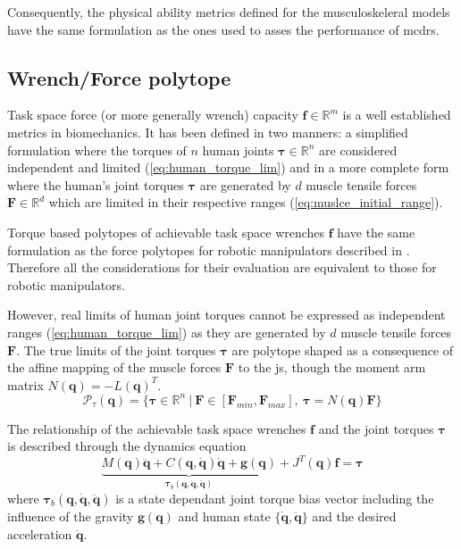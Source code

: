 Consequently, the physical ability metrics defined for the musculoskeleral models have the same formulation as the ones used to asses the performance of \glspl{mcdr}.

\subsection{Wrench/Force polytope}
\label{ch:force_poly_human}
Task space force (or more generally wrench) capacity $\bm{f} \in \mathbb{R}^m$ is a well established metrics in biomechanics. It has been defined in two manners: a simplified formulation where the torques of $n$ human joints $\bm{\tau} \in \mathbb{R}^n$ are considered independent and limited (\ref{eq:human_torque_lim}) and in a more complete form where the human's joint torques $\bm{\tau}$ are generated by $d$ muscle tensile forces $\bm{F} \in \mathbb{R}^d$ which are limited in their respective ranges (\ref{eq:muslce_initial_range}).

Torque based polytopes \cite{rezzoug_application_2012,sasaki2011vertex} of achievable task space wrenches $\bm{f}$ have the same formulation as the force polytopes for robotic manipulators described in . Therefore all the considerations for their evaluation are equivalent to those for robotic manipulators.  

However, real limits of human joint torques cannot be expressed as independent ranges (\ref{eq:human_torque_lim}) as they are generated by $d$ muscle tensile forces $\bm{F}$. The true limits of the joint torques $\bm{\tau}$ are polytope shaped as a consequence of the affine mapping of the muscle forces $\bm{F}$ to the \gls{js}, though the moment arm matrix $N(\bm{q})=-L(\bm{q})^T$.
\begin{equation}
\mathcal{P}_\tau(\bm{q}) = \{\bm{\tau} \in \mathbb{R}^n ~|~\bm{F}\in [\bm{F}_{min}, \bm{F}_{max}], ~\bm{\tau}=N(\bm{q})\bm{F}\}
\label{eq:poly_torque_human}
\end{equation}

The relationship of the achievable task space wrenches $\bm{f}$ and the joint torques $\bm{\tau}$ is described through the dynamics equation 
\begin{equation}
\underbrace{M(\bm{q})\ddot{\bm{q}} + C(\bm{q},\dot{\bm{q}})\dot{\bm{q}} + \bm{g}(\bm{q})}_{\bm{\tau}_b(\bm{q},\dot{\bm{q}},\ddot{\bm{q}})} + J^T(\bm{q})\bm{f} = \bm{\tau} 
\end{equation}
where $\bm{\tau}_b(\bm{q},\dot{\bm{q}},\ddot{\bm{q}})$ is a state dependant joint torque bias vector including the influence of the gravity $\bm{g}(\bm{q})$ and human state $\{\dot{\bm{q}},\ddot{\bm{q}}\}$ and the desired acceleration $\ddot{\bm{q}}$. 

